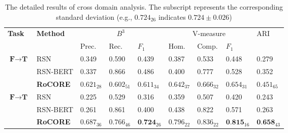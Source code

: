 \documentclass[11pt]{article}
\begin{document}
\begin{table*}
            \centering
            \begin{tabular}{ll lll lll l}
            \toprule
            \multirow{2}{*}{\textbf{Task}} & \multirow{2}{*}{\textbf{Method}} & \multicolumn{3}{c}{$B^3$} & \multicolumn{3}{c}{V-measure} & \multirow{2}{*}{ARI}\\
            \cline{3-8}
            & & Prec. & Rec. & $F_1$ & Hom. & Comp. & $F_1$\\
            \midrule
            \multirow{3}{*}{$\textbf{F}\rightarrow \textbf{T}$}
            &RSN & 0.349 & 0.590 & 0.439 & 0.387 & 0.533 & 0.448 & 0.279\\
            &RSN-BERT & 0.337 & 0.866 & 0.486 & 0.400 & 0.777 & 0.528 & 0.352\\
            &\textbf{RoCORE} & $0.621_{28}$ & $0.602_{51}$ & $0.611_{34}$ & $0.642_{37}$ & $0.666_{32}$ & $0.654_{31}$ & $0.451_{65}$\\
            \hline \hline
            \multirow{3}{*}{$\textbf{F}\rightarrow \textbf{T}$}
            &RSN & 0.225 & 0.529 & 0.316 & 0.359 & 0.507 & 0.420 & 0.243 \\
            &RSN-BERT & 0.261 & 0.861 & 0.400 & 0.438 & 0.822 & 0.571 & 0.263\\
            &\textbf{RoCORE}& $0.687_{36}$ & $0.766_{46}$ & $\textbf{0.724}_{26}$ & $0.796_{22}$ & $0.836_{22}$ & $\textbf{0.815}_{16}$ & $\textbf{0.658}_{43}$\\
            \bottomrule
            \end{tabular}
            \caption{
            The detailed results of cross domain analysis. The subscript represents the corresponding standard deviation (e.g., $0.724_{26}$ indicates $0.724\pm0.026$)
            }
            \label{tab:det_cro}
        \end{table*}   
\end{document}
